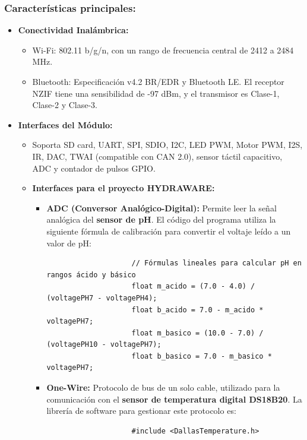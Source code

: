 \documentclass[a4paper,12pt]{article}
\begin{document}
	\subsubsection{Características principales:}
	\begin{itemize}
		\item \textbf{Conectividad Inalámbrica:}
		\begin{itemize}
			\item Wi-Fi: 802.11 b/g/n, con un rango de frecuencia central de 2412 a 2484 MHz.
			
			\item Bluetooth: Especificación v4.2 BR/EDR y Bluetooth LE. El receptor NZIF tiene una sensibilidad de -97 dBm, y el transmisor es Clase-1, Clase-2 y Clase-3.
		\end{itemize}
		
		\item \textbf{Interfaces del Módulo:}
		\begin{itemize}
			\item Soporta SD card, UART, SPI, SDIO, I2C, LED PWM, Motor PWM, I2S, IR, DAC, TWAI (compatible con CAN 2.0), sensor táctil capacitivo, ADC y contador de pulsos GPIO.
			
			\item \textbf{Interfaces para el proyecto HYDRAWARE:}
			\begin{itemize}
				\item \textbf{ADC (Conversor Analógico-Digital):} Permite leer la señal analógica del \textbf{sensor de pH}. El código del programa utiliza la siguiente fórmula de calibración para convertir el voltaje leído a un valor de pH:
				\begin{verbatim}
					// Fórmulas lineales para calcular pH en rangos ácido y básico
					float m_acido = (7.0 - 4.0) / (voltagePH7 - voltagePH4);
					float b_acido = 7.0 - m_acido * voltagePH7;
					float m_basico = (10.0 - 7.0) / (voltagePH10 - voltagePH7);
					float b_basico = 7.0 - m_basico * voltagePH7;
				\end{verbatim}
				\item \textbf{One-Wire:} Protocolo de bus de un solo cable, utilizado para la comunicación con el \textbf{sensor de temperatura digital DS18B20}. La librería de software para gestionar este protocolo es:
				\begin{verbatim}
					#include <DallasTemperature.h>
				\end{verbatim}
			\end{itemize}
		\end{itemize}
		

\end{itemize}
\end{document}

